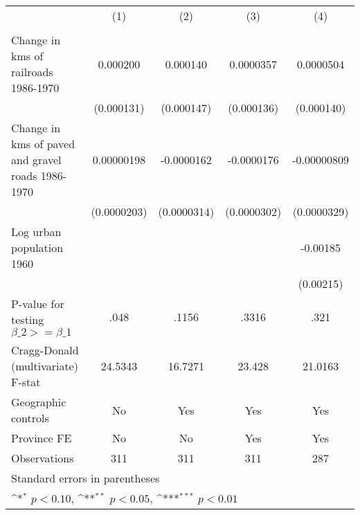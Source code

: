 {
\def\sym#1{\ifmmode^{#1}\else\(^{#1}\)\fi}
\begin{tabular}{l*{4}{c}}
\hline\hline
                &\multicolumn{1}{c}{(1)}&\multicolumn{1}{c}{(2)}&\multicolumn{1}{c}{(3)}&\multicolumn{1}{c}{(4)}\\
                &\multicolumn{1}{c}{}&\multicolumn{1}{c}{}&\multicolumn{1}{c}{}&\multicolumn{1}{c}{}\\
\hline
Change in kms of railroads 1986-1970& 0.000200         & 0.000140         &0.0000357         &0.0000504         \\
                &(0.000131)         &(0.000147)         &(0.000136)         &(0.000140)         \\
[1em]
Change in kms of paved and gravel roads 1986-1970&0.00000198         &-0.0000162         &-0.0000176         &-0.00000809         \\
                &(0.0000203)         &(0.0000314)         &(0.0000302)         &(0.0000329)         \\
[1em]
Log urban population 1960&                  &                  &                  & -0.00185         \\
                &                  &                  &                  &(0.00215)         \\
\hline
P-value for testing $\beta\_{2} >= \beta\_{1}$&     .048         &    .1156         &    .3316         &     .321         \\
Cragg-Donald (multivariate) F-stat&  24.5343         &  16.7271         &   23.428         &  21.0163         \\
Geographic controls&       No         &      Yes         &      Yes         &      Yes         \\
Province FE     &       No         &       No         &      Yes         &      Yes         \\
Observations    &      311         &      311         &      311         &      287         \\
\hline\hline
\multicolumn{5}{l}{\footnotesize Standard errors in parentheses}\\
\multicolumn{5}{l}{\footnotesize \sym{*} \(p<0.10\), \sym{**} \(p<0.05\), \sym{***} \(p<0.01\)}\\
\end{tabular}
}
